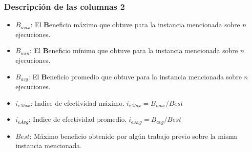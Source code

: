 \documentclass{beamer}
\begin{document}

\begin{frame}
\frametitle{Descripción de las columnas 2}

\begin{itemize}
	\item \textbf{$B_{max}$}: El \textbf{B}eneficio máximo que obtuve para la instancia mencionada sobre $n$ ejecuciones.
	\item \textbf{$B_{min}$}: El \textbf{B}eneficio mínimo que obtuve para la instancia mencionada sobre $n$ ejecuciones.
	\item \textbf{$B_{avg}$}: El \textbf{B}eneficio promedio que obtuve para la instancia mencionada sobre $n$ ejecuciones.
	\item \textbf{$i_{eMax}$}: Indice de efectividad máximo. $i_{eMax}=B_{max}/Best$
	\item \textbf{$i_{eAvg}$}: Indice de efectividad promedio. $i_{eAvg}=B_{avg}/Best$
	\item \textbf{$Best$}: Máximo beneficio obtenido por algún trabajo previo sobre la misma instancia mencionada.
\end{itemize}

\end{frame}

\end{document}
